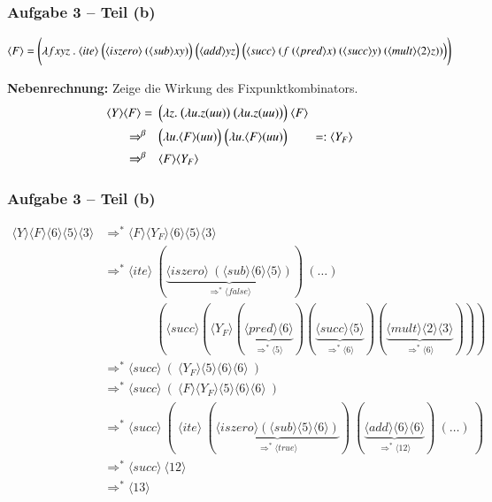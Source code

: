 \documentclass[aspectratio=1610,onlymath, ngerman]{beamer}
\renewcommand{\emph}[1]{\textbf{#1}}
\newcommand{\num}[1]{\ensuremath{\langle #1 \rangle}}
\begin{document}
	\begin{frame} \frametitle{Aufgabe 3 -- Teil (b)}
	\small
		\begin{equation*}
			\num{F} = \Biggl( \lambda f xyz \ . \ \num{ite} \ \Bigl(\num{iszero} \ (\num{sub} x y )\Bigr) \ \Bigl( \num{add} y z \Bigr) \ \Bigl( \num{succ} \ ( f \ (\num{pred} x) \ (\num{succ} y) \ ( \num{mult} \num{2} z )) \Bigr) \Biggr)
		\end{equation*}
		
		\bigskip 
		\pause
		
		\emph{Nebenrechnung:} Zeige die Wirkung des Fixpunktkombinators.
		\pause
		\begin{align*}
			\num{Y} \num{F}
			= \enskip &\Bigl( \lambda z . \ \bigl( \lambda u . z (uu) \bigr) \ \bigl( \lambda u. z (uu) \bigr) \Bigr) \ \num{F} \\
			\Rightarrow^{\beta} \quad &\Bigl( \lambda u . \num{F} (uu) \Bigr) \ \Bigl( \lambda u. \num{F} (uu) \Bigr) \qquad =: \num{Y_F} \\
			\Rightarrow^{\beta} \quad &\num{F} \num{Y_F}
		\end{align*}
	\end{frame}

	\begin{frame} \frametitle{Aufgabe 3 -- Teil (b)}
	\small
		\begin{align*}
			\num{Y} \num{F} \num{6} \num{5} \num{3} &\Rightarrow^\ast \num{F} \num{Y_F} \num{6} \num{5} \num{3} \\
			&\Rightarrow^\ast \num{ite} \ 
			(\underbrace{\num{iszero} \ (\num{sub}\num{6}\num{5})}_{\Rightarrow^\ast \num{false}}) \ 
			( \dots ) \\
			& \phantom{\Rightarrow^\ast \num{ite}} \ (\num{succ} (\num{Y_F}(\underbrace{\num{pred}\num{6}}_{\Rightarrow^\ast \num{5}})(\underbrace{\num{succ}\num{5}}_{\Rightarrow^\ast \num{6}})(\underbrace{\num{mult}\num{2}\num{3}}_{\Rightarrow^\ast \num{6}}))) \\
			&\Rightarrow^\ast \num{succ} \  ( \ \num{Y_F}\num{5}\num{6}\num{6} \ ) \\
			&\Rightarrow^\ast \num{succ} \ ( \ \num{F} \num{Y_F} \num{5}\num{6}\num{6} \ ) \\
			&\Rightarrow^\ast \num{succ} \ ( \ \num{ite} \  (\underbrace{\num{iszero}(\num{sub}\num{5}\num{6})}_{\Rightarrow^\ast \num{true}}) \ (\underbrace{\num{add}\num{6}\num{6}}_{\Rightarrow^\ast \num{12}})  \ (\dots) \ ) \\
			&\Rightarrow^\ast \num{succ} \ \num{12} \\
			&\Rightarrow^\ast \num{13}
		\end{align*}
	\end{frame}
	
\end{document}
